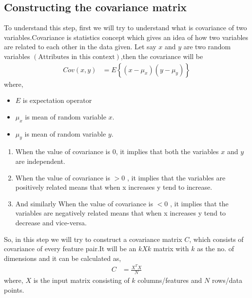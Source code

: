 \documentclass[journal,12pt,onecolumn]{IEEEtran}
\providecommand{\brak}[1]{\ensuremath{\left(#1\right)}}
\providecommand{\cbrak}[1]{\ensuremath{\left\{#1\right\}}}
\theoremstyle{remark}
\numberwithin{equation}{section}
\begin{document}
	        \subsection{Constructing the covariance matrix}
                  To understand this step, first we will try to understand what is covariance of two variables.Covariance is statistics concept which gives an idea of how two variables are related to each other in the data given. Let say $x$ and $y$ are two random variables $\brak{\text{Attributes in this context}}$,then the covariance will be
		  \begin{align}
			  Cov\brak{x,y} &= E\cbrak{\brak{x - \mu_x}\brak{y-\mu_{y}}}
	          \end{align}
		  where, \begin{itemize}
			   \item $E$ is expectation operator
			   \item $\mu_x$ is mean of random variable $x$.
			   \item $\mu_y$ is mean of random variable $y$.
                         \end{itemize}
	   \begin{enumerate}
	        \item  When the value of covariance is $0$, it implies that both the variables $x$ and $y$ are independent.
                \item When the value of covariance is $>0$ , it implies that the variables are positively related means that when x increases y tend to increase.
		\item And similarly When the value of covariance is $<0$ , it implies that the variables are negatively related means that when x increases y tend to decrease and vice-versa.
	   \end{enumerate}
	   So, in this step we will try to construct a covariance matrix $C$, which consists of covariance of every feature pair.It will be an $kXk$ matrix with $k$ as the no. of dimensions and it can be calculated as,
	      \begin{align}
		      C &= \frac{X^{T}X}{N}
              \end{align}
	      where, $X$ is the input matrix consisting of $k$ columns/features and $N$ rows/data points.
\end{document}
